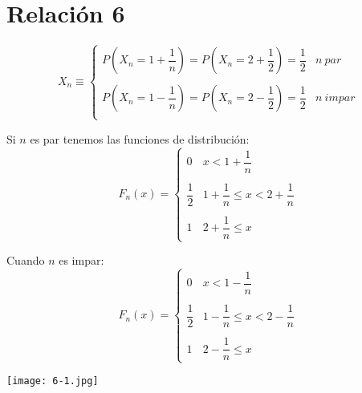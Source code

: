 \documentclass[openany]{book}
\begin{document}
\chapter{Relación 6}

\begin{exercise}
    $$ X_n\equiv \left\{
    \begin{array}{ll}
        P(X_n=1+\dfrac{1}{n}) = P(X_n=2+\dfrac{1}{2}) = \dfrac{1}{2} & n\ par\\\\
        P(X_n=1-\dfrac{1}{n}) = P(X_n=2-\dfrac{1}{2}) = \dfrac{1}{2} & n\ impar\\
    \end{array}
    \right. $$

    Si $ n $ es par tenemos las funciones de distribución:
    $$ F_n (x) = \left\{
    \begin{array}{ll}
        0 & x<1+\dfrac{1}{n} \\ \\
        \dfrac{1}{2} & 1+\dfrac{1}{n} \leq  x < 2+\dfrac{1}{n}\\\\
        1 & 2+\dfrac{1}{n} \leq  x
    \end{array}
    \right. $$

    Cuando $ n $ es impar:
    $$ F_n (x) = \left\{
    \begin{array}{ll}
        0 & x<1-\dfrac{1}{n} \\ \\
        \dfrac{1}{2} & 1-\dfrac{1}{n} \leq  x < 2-\dfrac{1}{n}\\\\
        1 & 2-\dfrac{1}{n} \leq  x
    \end{array}
    \right. 
    $$

    \begin{center}
        \texttt{[image: 6-1.jpg]}
    \end{center}
    


\end{exercise}
\end{document}
